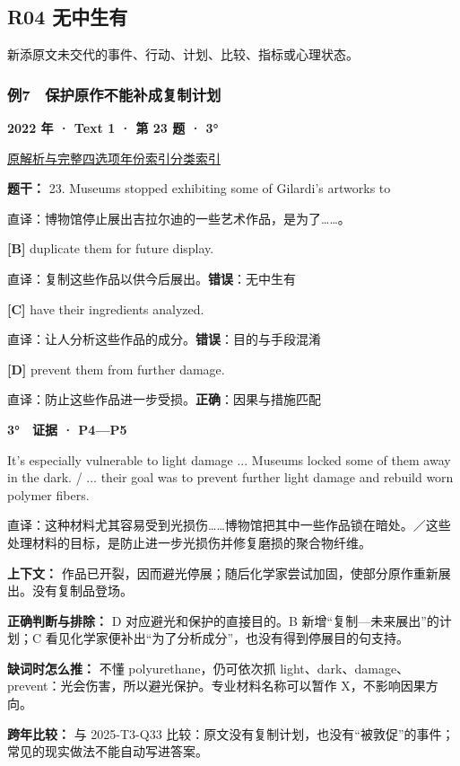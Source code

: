 \documentclass[11pt,a4paper]{article}
\begin{document}
\subsection{R04 无中生有}
新添原文未交代的事件、行动、计划、比较、指标或心理状态。

\subsubsection{例7　保护原作不能补成复制计划}\label{case-2022-T1-Q23}
\noindent\textbf{2022 年 · Text 1 · 第 23 题 · 3°}\par\noindent \href{https://zj139.github.io/math-notes/english/8d838346cad6a2c77d6282c8/\#q23}{原解析与完整四选项}\quad \hyperref[idx-2022-T1-Q23]{年份索引}\quad \hyperref[class-R04]{分类索引}\par\smallskip
\noindent\textbf{题干：} 23. Museums stopped exhibiting some of Gilardi’s artworks to\par\smallskip
直译：博物馆停止展出吉拉尔迪的一些艺术作品，是为了……。

\noindent\textbf{[B]} duplicate them for future display.\par\nopagebreak
\noindent 直译：复制这些作品以供今后展出。\quad\textbf{错误}：无中生有\par\smallskip
{}\noindent\textbf{[C]} have their ingredients analyzed.\par\nopagebreak
\noindent 直译：让人分析这些作品的成分。\quad\textbf{错误}：目的与手段混淆\par\smallskip
{}\noindent\textbf{[D]} prevent them from further damage.\par\nopagebreak
\noindent 直译：防止这些作品进一步受损。\quad\textbf{正确}：因果与措施匹配\par\smallskip
\begin{evidence}\textbf{3°　证据 · P4—P5}\par It’s especially vulnerable to light damage ... Museums locked some of them away in the dark. / ... their goal was to prevent further light damage and rebuild worn polymer fibers.\par 直译：这种材料尤其容易受到光损伤……博物馆把其中一些作品锁在暗处。／这些处理材料的目标，是防止进一步光损伤并修复磨损的聚合物纤维。\end{evidence}
\noindent\textbf{上下文：} 作品已开裂，因而避光停展；随后化学家尝试加固，使部分原作重新展出。没有复制品登场。\par\smallskip
\noindent\textbf{正确判断与排除：} D 对应避光和保护的直接目的。B 新增“复制—未来展出”的计划；C 看见化学家便补出“为了分析成分”，也没有得到停展目的句支持。\par\smallskip
\noindent\textbf{缺词时怎么推：} 不懂 polyurethane，仍可依次抓 light、dark、damage、prevent：光会伤害，所以避光保护。专业材料名称可以暂作 X，不影响因果方向。\par\smallskip
\noindent\textbf{跨年比较：} 与 2025-T3-Q33 比较：原文没有复制计划，也没有“被敦促”的事件；常见的现实做法不能自动写进答案。\par\smallskip
\clearpage
\end{document}
